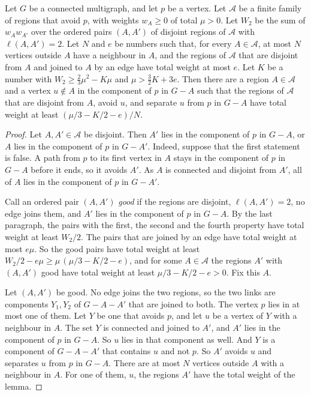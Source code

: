 \begin{lemma}\label{lem:sep}
Let $G$ be a connected multigraph, and let $p$ be a vertex. Let $\mathcal A$ be a finite family of
regions that avoid $p$, with weights $w_A\ge0$ of total $\mu>0$. Let $W_2$ be the sum of
$w_Aw_{A'}$ over the ordered pairs $(A,A')$ of disjoint regions of $\mathcal A$ with
$\ell(A,A')=2$. Let $N$ and $e$ be numbers such that, for every $A\in\mathcal A$, at most $N$
vertices outside $A$ have a neighbour in $A$, and the regions of $\mathcal A$ that are disjoint
from $A$ and joined to $A$ by an edge have total weight at most $e$. Let $K$ be a number with
$W_2\ge\frac23\mu^{2}-K\mu$ and $\mu>\frac32K+3e$. Then there are a region $A\in\mathcal A$ and a
vertex $u\notin A$ in the component of $p$ in $G-A$ such that the regions of $\mathcal A$ that
are disjoint from $A$, avoid $u$, and separate $u$ from $p$ in $G-A$ have total weight at least
$(\mu/3-K/2-e)/N$.
\end{lemma}

\begin{proof}
Let $A,A'\in\mathcal A$ be disjoint. Then $A'$ lies in the component of $p$ in $G-A$, or $A$ lies
in the component of $p$ in $G-A'$. Indeed, suppose that the first statement is false. A path from
$p$ to its first vertex in $A$ stays in the component of $p$ in $G-A$ before it ends, so it avoids
$A'$. As $A$ is connected and disjoint from $A'$, all of $A$ lies in the component of $p$ in
$G-A'$.

Call an ordered pair $(A,A')$ \emph{good} if the regions are disjoint, $\ell(A,A')=2$, no edge
joins them, and $A'$ lies in the component of $p$ in $G-A$. By the last paragraph, the pairs with
the first, the second and the fourth property have total weight at least $W_2/2$. The pairs that
are joined by an edge have total weight at most $e\mu$. So the good pairs have total weight at
least $W_2/2-e\mu\ge\mu\,(\mu/3-K/2-e)$, and for some $A\in\mathcal A$ the regions $A'$ with
$(A,A')$ good have total weight at least $\mu/3-K/2-e>0$. Fix this $A$.

Let $(A,A')$ be good. No edge joins the two regions, so the two links are components $Y_1,Y_2$ of
$G-A-A'$ that are joined to both. The vertex $p$ lies in at most one of them. Let $Y$ be one that
avoids $p$, and let $u$ be a vertex of $Y$ with a neighbour in $A$. The set $Y$ is connected and
joined to $A'$, and $A'$ lies in the component of $p$ in $G-A$. So $u$ lies in that component as
well. And $Y$ is a component of $G-A-A'$ that contains $u$ and not $p$. So $A'$ avoids $u$ and
separates $u$ from $p$ in $G-A$. There are at most $N$ vertices outside $A$ with a neighbour in
$A$. For one of them, $u$, the regions $A'$ have the total weight of the lemma.
\end{proof}


